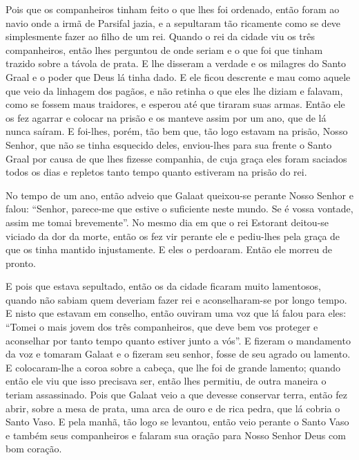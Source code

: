 Pois que os companheiros tinham feito o que lhes foi ordenado, então foram ao
navio onde a irmã de Parsifal jazia, e a sepultaram tão ricamente como se deve
simplesmente fazer ao filho de um rei. Quando o rei da cidade viu os três
companheiros, então lhes perguntou de onde seriam e o que foi que tinham
trazido sobre a távola de prata. E lhe disseram a verdade e os milagres do
Santo Graal e o poder que Deus lá tinha dado. E ele ficou descrente e mau como
aquele que veio da linhagem dos pagãos, e não retinha o que eles lhe diziam e
falavam, como se fossem maus traidores, e esperou até que tiraram suas armas. 
Então ele os fez agarrar e colocar na prisão e os manteve assim por um ano, que
de lá nunca saíram. E foi-lhes, porém, tão bem que, tão logo estavam na prisão,
Nosso Senhor, que não se tinha esquecido deles, enviou-lhes para sua frente o
Santo Graal por causa de que lhes fizesse companhia, de cuja graça eles foram
saciados todos os dias e repletos tanto tempo quanto estiveram na prisão do
rei.

No tempo de um ano, então adveio que Galaat queixou-se perante Nosso Senhor e
falou: “Senhor, parece-me que estive o suficiente neste mundo. Se é vossa
vontade, assim me tomai brevemente”. No mesmo dia em que o rei Estorant
deitou-se viciado da dor da morte, então os fez vir perante ele e pediu-lhes
pela graça de que os tinha mantido injustamente. E eles o perdoaram.
Então ele morreu de pronto. 

E pois que estava sepultado, então os da cidade ficaram muito lamentosos, quando
não sabiam quem deveriam fazer rei e aconselharam-se por longo tempo. E nisto
que estavam em conselho, então ouviram uma voz que lá falou para eles: “Tomei o
mais jovem dos três companheiros, que deve bem vos proteger e aconselhar por
tanto tempo quanto estiver junto a vós”. E fizeram o mandamento da voz
e tomaram Galaat e o fizeram seu senhor, fosse de seu agrado ou lamento. E
colocaram-lhe a coroa sobre a cabeça, que lhe foi de grande lamento; quando
então ele viu que isso precisava ser, então lhes permitiu, de outra maneira o
teriam assassinado. Pois que Galaat veio a que devesse conservar terra, então
fez abrir, sobre a mesa de prata, uma arca de ouro e de rica pedra, que lá
cobria o Santo Vaso. E pela manhã, tão logo se levantou, então veio perante o
Santo Vaso e também seus companheiros e falaram sua oração para Nosso Senhor
Deus com bom coração. 

